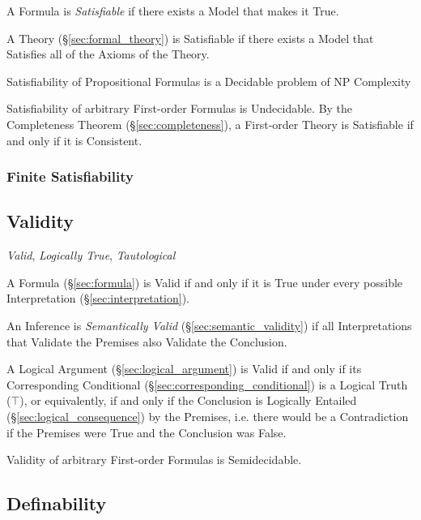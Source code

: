 A Formula is \emph{Satisfiable} if there exists a Model that makes it
True.

A Theory (\S\ref{sec:formal_theory}) is Satisfiable if there exists a
Model that Satisfies all of the Axioms of the Theory.

Satisfiability of Propositional Formulas is a Decidable problem of NP
Complexity %

Satisfiability of arbitrary First-order Formulas is Undecidable. By
the Completeness Theorem (\S\ref{sec:completeness}), a First-order
Theory is Satisfiable if and only if it is Consistent.



\subsubsection{Finite Satisfiability}\label{sec:finite_satisfiability}



\subsection{Validity}\label{sec:validity}

\emph{Valid}, \emph{Logically True}, \emph{Tautological}

A Formula (\S\ref{sec:formula}) is Valid if and only if it is True
under every possible Interpretation (\S\ref{sec:interpretation}).

An Inference is \emph{Semantically Valid}
(\S\ref{sec:semantic_validity}) if all Interpretations that Validate
the Premises also Validate the Conclusion.

A Logical Argument (\S\ref{sec:logical_argument}) is Valid if and only
if its Corresponding Conditional
(\S\ref{sec:corresponding_conditional}) is a Logical Truth ($\top$),
or equivalently, if and only if the Conclusion is Logically Entailed
(\S\ref{sec:logical_consequence}) by the Premises, i.e. there would be
a Contradiction if the Premises were True and the Conclusion was
False.

Validity of arbitrary First-order Formulas is Semidecidable.



\subsection{Definability}\label{sec:definability}

